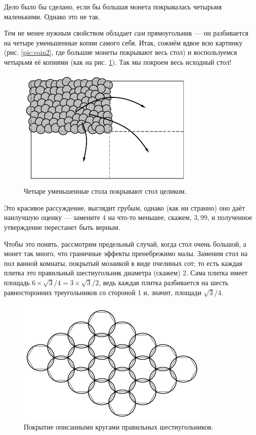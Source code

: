 Дело было бы сделано, если бы большая монета покрывалась четырьмя маленькими.
Однако это не так.

Тем не менее нужным свойством обладает \emph{сам} прямоугольник --- он разбивается на четыре уменьшенные копии самого себя.
Итак, сожмём вдвое всю картинку (рис. \ref{pic:coin2}, где большие монеты покрывают весь стол) и воспользуемся четырьмя её копиями (как на рис. \ref{pic:coin3}).
Так мы покроем весь исходный стол!


\begin{figure}[t!]
\centering
\includegraphics[scale=1]{pics/coin3}
\caption{Четыре уменьшенные стола покрывают стол целиком.}
\label{pic:coin3}
\end{figure}

\medskip

Это красивое рассуждение, выглядит грубым, однако (как ни странно) оно даёт наилучшую оценку --- замените $4$ на что-то меньшее, скажем, $3{,}99$, и полученное утверждение перестанет быть верным.

Чтобы это понять, рассмотрим предельный случай, когда стол очень большой, а монет так много, что граничные эффекты пренебрежимо малы.
Заменим стол на пол ванной комнаты, покрытый мозаикой в виде пчелиных сот;
то есть каждая плитка это правильный шестиугольник диаметра (скажем) 2.
Сама плитка имеет площадь $6\times\sqrt{3}/4=3\times\sqrt{3}/2$, ведь каждая плитка разбивается на шесть равносторонних треугольников со стороной 1 и, значит, площади $\sqrt{3}/4$.

\begin{figure}[t!]
\centering
\includegraphics[scale=1]{pics/coin4}
\caption{Покрытие описанными кругами правильных шестиугольников.}
\label{pic:coin4}
\end{figure}

